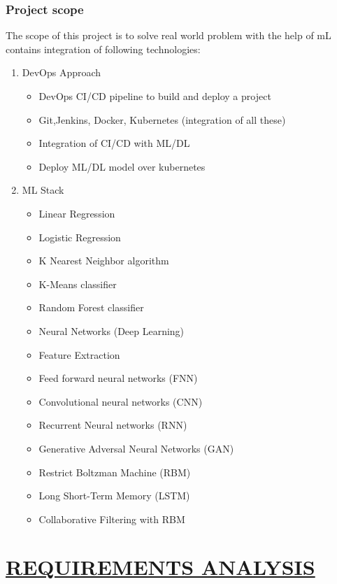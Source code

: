 \documentclass[12pt,oneside,a4paper]{report}
\begin{document}
\subsection{Project scope}
The scope of this project is to solve real world problem with the help of mL
contains integration of following technologies:
\begin{enumerate}
\item DevOps Approach
\begin{itemize}
\item    DevOps CI/CD pipeline to build and deploy a project
\item    Git,Jenkins, Docker, Kubernetes (integration of all these)
\item    Integration of CI/CD with ML/DL
\item    Deploy ML/DL model over kubernetes
\end{itemize}
\item ML Stack
\begin{itemize}
\item Linear Regression
\item Logistic Regression
\item K Nearest Neighbor algorithm
\item K-Means classifier
\item Random Forest classifier
\item Neural Networks (Deep Learning)
\item Feature Extraction
\item Feed forward neural networks (FNN)
\item Convolutional neural networks (CNN)
\item Recurrent Neural networks (RNN)
\item Generative Adversal Neural Networks (GAN)
\item Restrict Boltzman Machine (RBM)
\item Long Short-Term Memory (LSTM)
\item Collaborative Filtering with RBM
\end{itemize}
\end{enumerate}

\chapter{\underline{REQUIREMENTS ANALYSIS}}
\end{document}
